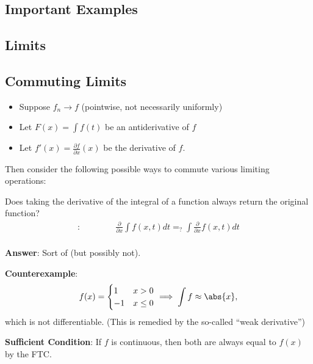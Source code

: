 \hypertarget{important-examples}{%
\subsection{Important Examples}\label{important-examples}}

\hypertarget{limits-1}{%
\subsection{Limits}\label{limits-1}}


\hypertarget{commuting-limits}{%
\subsection{Commuting Limits}\label{commuting-limits}}

\begin{itemize}
\tightlist
\item
  Suppose \(f_n \to f\) (pointwise, not necessarily uniformly)
\item
  Let \(F(x) = \int f(t)\) be an antiderivative of \(f\)
\item
  Let \(f'(x) = \frac{\partial f}{\partial x}(x)\) be the derivative of
  \(f\).
\end{itemize}

Then consider the following possible ways to commute various limiting
operations:

Does taking the derivative of the integral of a function always return
the original function?
\begin{align*}
[\frac{\partial}{\partial x}, \int dx]:\qquad\qquad \frac{\partial}{\partial x}\int f(x, t)dt =_? \int \frac{\partial}{\partial x} f(x, t)dt\\
\text{}
\end{align*}

\textbf{Answer}: Sort of (but possibly not).

\textbf{Counterexample}:
\begin{align*}
f(x) = 
\begin{cases}
1 & x > 0 \\ 
-1 & x \leq 0
\end{cases}
\implies \int f \approx \abs{x},
\end{align*} which is not differentiable. (This is remedied by the
so-called ``weak derivative'')

\textbf{Sufficient Condition}: If \(f\) is continuous, then both are
always equal to \(f(x)\) by the FTC.

